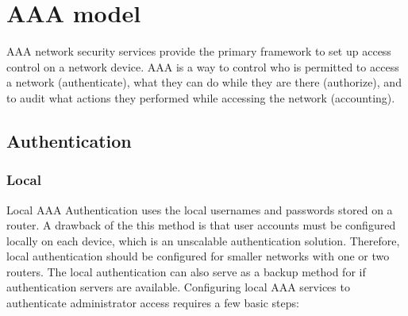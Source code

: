 \chapter{AAA model}

AAA network security services provide the primary framework to set up access control on a network device. AAA is a way to control who is permitted to access a network (authenticate), what they can do while they are there (authorize), and to audit what actions they performed while accessing the network (accounting).




\section{Authentication}

\subsection{Local}

Local AAA Authentication uses the local usernames and passwords stored on a router. A drawback of the this method is that user accounts must be configured locally on each device, which is an unscalable authentication solution. Therefore, local authentication should be configured for smaller networks with one or two routers. The local authentication can also serve as a backup method for if authentication servers are available. Configuring local AAA services to authenticate administrator access requires a few basic steps:

